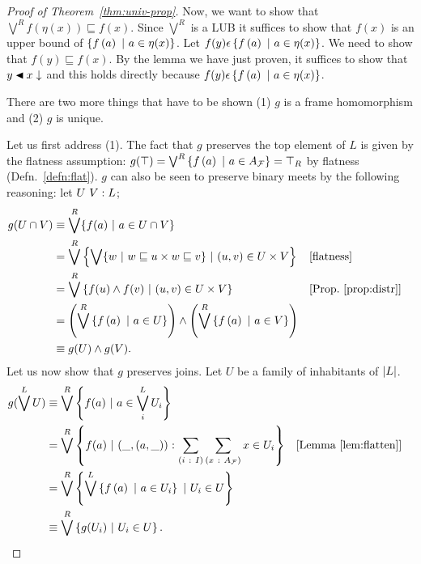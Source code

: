 \begin{proof}[Proof of Theorem~\ref{thm:univ-prop}]
  Now, we want to show that $\bigvee^R f(\eta(x)) \sqsubseteq f(x)$. Since $\bigvee^R$ is a LUB it suffices to
  show that $f(x)$ is an upper bound of $\left\{  f\left( a \right) ~|~ a \in \eta(x)  \right\}$. Let $f(y) \epsilon \left\{  f\left( a \right) ~|~ a \in \eta(x)  \right\}$.
  We need to show that $f(y) \sqsubseteq f(x)$. By the lemma we have just proven, it suffices to
  show that $\covers{y}{x\downarrow}$ and this holds directly because $f(y) \epsilon \left\{  f\left( a \right) ~|~ a \in \eta(x)  \right\}$.

  There are two more things that have to be shown (1) $g$ is a frame homomorphism and (2)
  $g$ is unique.

  Let us first address (1). The fact that $g$ preserves the top element of $L$ is given
  by the flatness assumption: $g(\top) = \bigvee^R \left\{  f\left( a \right) ~|~ a \in A_{\mathcal{F}{}}  \right\} = \top_R$ by
  flatness (Defn.~\ref{defn:flat}). $g$ can also be seen to preserve binary meets by
  the following reasoning: let $U~V:L$;
  \begin{align*}
    g(U \cap V) &\equiv \bigvee^R \{ f(a) ~|~ a \in U \cap V \} \\
             &= \bigvee^R \left\{  \bigvee \{ w ~|~ w \sqsubseteq u \times w \sqsubseteq v \} ~|~ (u, v) \in U \times V  \right\}
               && \text{[flatness]}                                                 \\
             &= \bigvee^R \left\{  f(u) \wedge f(v) ~|~ (u, v) \in U \times V  \right\}
               &&\text{[Prop.~\ref{prop:distr}]}                                    \\
             &= \left( \bigvee^R \left\{  f\left( a \right) ~|~ a \in U  \right\} \right) \wedge \left( \bigvee^R \left\{  f\left( a \right) ~|~ a \in V  \right\} \right)       \\
             &\equiv g(U) \wedge g(V)                                                         .
  \end{align*}
  Let us now show that $g$ preserves joins. Let $U$ be a family of inhabitants of
  $\left| L \right|$.
  \begin{align*}
    g(\bigvee^L U) &\equiv \bigvee^R \left\{  f(a) ~|~ a \in \bigvee^L_i U_i  \right\} \\
             &= \bigvee^R \left\{  f(a) ~|~ (\_, (a, \_))\hspace{0.1mm}:\hspace{0.1mm}\sum_{(i~:~I)} \sum_{(x~:~A_{\mathcal{F}{}})} x \in U_i  \right\} &&\text{[Lemma~\ref{lem:flatten}]} \\
             &= \bigvee^R \left\{  \bigvee^L \left\{  f\left( a \right) ~|~ a \in U_i  \right\} ~|~ U_i \in U  \right\} \\
             &\equiv \bigvee^R \left\{  g(U_i) ~|~ U_i \in U  \right\}.
  \end{align*}


\end{proof}
